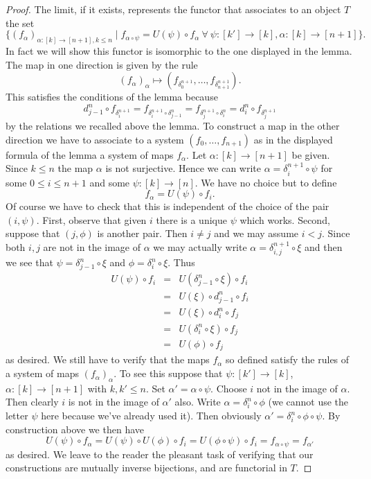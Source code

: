\begin{proof}
The limit, if it exists, represents the functor
that associates to an object $T$ the set
$$
\{
(f_\alpha)_{\alpha : [k] \to [n + 1], k \leq n}
\mid
f_{\alpha \circ \psi} = U(\psi) \circ f_\alpha\ \forall\ 
\psi : [k'] \to [k], \alpha : [k] \to [n + 1]
\}.
$$
In fact we will show this functor is isomorphic to the
one displayed in the lemma. The map in one direction
is given by the rule
$$
(f_\alpha)_{\alpha}
\longmapsto
(f_{\delta^{n + 1}_0}, \ldots, f_{\delta^{n + 1}_{n + 1}}).
$$
This satisfies the conditions of the lemma because
$$
d^n_{j - 1} \circ f_{\delta^{n + 1}_i} =
f_{\delta^{n + 1}_i \circ \delta^n_{j - 1}} =
f_{\delta^{n + 1}_j \circ \delta^n_i} =
d^n_i \circ f_{\delta^{n + 1}_j}
$$
by the relations we recalled above the lemma. To construct a map
in the other direction we have to associate to a system
$(f_0, \ldots, f_{n + 1})$ as in the displayed formula
of the lemma a system of maps $f_\alpha$. Let $\alpha : [k] \to [n + 1]$
be given. Since $k \leq n$ the map $\alpha$ is not surjective.
Hence we can write $\alpha = \delta^{n + 1}_i \circ \psi$
for some $0 \leq i \leq n + 1$ and some
$\psi : [k] \to [n]$. We have no choice but to define
$$
f_\alpha = U(\psi) \circ f_i.
$$
Of course we have to check that this is independent of the
choice of the pair $(i, \psi)$. First, observe that given $i$
there is a unique $\psi$ which works. Second, suppose that $(j, \phi)$ is
another pair. Then $i \not = j$ and we may assume $i < j$. Since
both $i, j$ are not in the image of $\alpha$ we may actually
write $\alpha = \delta^{n + 1}_{i, j} \circ \xi$ and then
we see that $\psi = \delta^n_{j - 1} \circ \xi$ and
$\phi = \delta^n_i \circ \xi$. Thus
\begin{eqnarray*}
U(\psi) \circ f_i & = & U(\delta^n_{j - 1} \circ \xi) \circ f_i \\
& = & U(\xi) \circ d^n_{j - 1} \circ f_i \\
& = & U(\xi) \circ d^n_i \circ f_j \\
& = & U(\delta^n_i \circ \xi) \circ f_j \\
& = & U(\phi) \circ f_j
\end{eqnarray*}
as desired. We still have to verify that the maps
$f_\alpha$ so defined satisfy the rules of a system
of maps $(f_\alpha)_\alpha$. To see this suppose that
$\psi : [k'] \to [k]$, $\alpha : [k] \to [n + 1]$ with
$k, k' \leq n$. Set $\alpha' = \alpha \circ \psi$.
Choose $i$ not in the image of $\alpha$. Then clearly
$i$ is not in the image of $\alpha'$ also. Write
$\alpha = \delta^n_i \circ \phi$ (we cannot use the letter $\psi$ here
because we've already used it). Then obviously
$\alpha' = \delta^n_i \circ \phi \circ \psi$. By construction above
we then have
$$
U(\psi) \circ f_\alpha = U(\psi) \circ U(\phi) \circ f_i
= U(\phi \circ \psi) \circ f_i = f_{\alpha \circ \psi} = f_{\alpha'}
$$
as desired. We leave to the reader the pleasant task of verifying
that our constructions are mutually inverse bijections, and are
functorial in $T$.
\end{proof}

